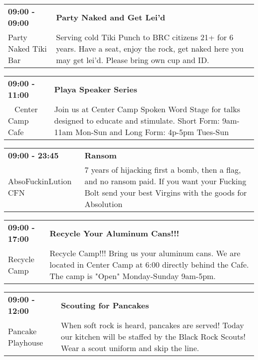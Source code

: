 \begin{tabular}{ p{1in} p{2.2in} }
    \textbf{09:00 - 09:00} & \textbf{Party Naked and Get Lei'd} \\
    Party Naked Tiki Bar \newline  & Serving cold Tiki Punch to BRC citizens 21+ for 6 years. Have a seat, enjoy the rock, get naked here you may get lei'd. Please bring own cup and ID. \\
    \hline 
\end{tabular}
    
\begin{tabular}{ p{1in} p{2.2in} }
    \textbf{09:00 - 11:00} & \textbf{Playa Speaker Series} \\
    ~ \newline Center Camp Cafe & Join us at Center Camp Spoken Word Stage for  talks designed to educate and stimulate. Short Form: 9am-11am Mon-Sun and Long Form: 4p-5pm Tues-Sun \\
    \hline 
\end{tabular}
    
\begin{tabular}{ p{1in} p{2.2in} }
    \textbf{09:00 - 23:45} & \textbf{Ransom} \\
    AbsoFuckinLution \newline CFN & 7 years of hijacking first a bomb, then a flag, and no ransom paid. If you want your Fucking Bolt send your best Virgins with the goods for Absolution \\
    \hline 
\end{tabular}
    
\begin{tabular}{ p{1in} p{2.2in} }
    \textbf{09:00 - 17:00} & \textbf{Recycle Your Aluminum Cans!!!} \\
    Recycle Camp \newline  & Recycle Camp!!! Bring us your aluminum cans. We are located in Center Camp at 6:00 directly behind the Cafe. The camp is "Open" Monday-Sunday 9am-5pm. \\
    \hline 
\end{tabular}
    
\begin{tabular}{ p{1in} p{2.2in} }
    \textbf{09:00 - 12:00} & \textbf{Scouting for Pancakes} \\
    Pancake Playhouse \newline  & When soft rock is heard, pancakes are served!  Today our kitchen will be staffed by the Black Rock Scouts!  Wear a scout uniform and skip the line. \\
    \hline 
\end{tabular}
    
